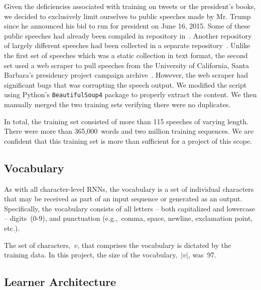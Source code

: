 \documentclass{article}
\begin{document}
Given the deficiencies associated with training on tweets or the president's books, we decided to exclusively limit ourselves to public speeches made by Mr. Trump since he announced his bid to run for president on June 16, 2015.  Some of these public speeches had already been compiled in repository in~\cite{ryanMcdermottTrumpSpeeches}.  Another repository of largely different speeches had been collected in a separate repository~\cite{pedramNavidTrumpSpeeches}.  Unlike the first set of speeches which was a static collection in text format, the second set used a web scraper to pull speeches from the University of California, Santa Barbara's presidency project campaign archive~\cite{americanPresidencyProject}.  However, the web scraper had significant bugs that was corrupting the speech output.  We modified the script using Python's \texttt{BeautifulSoup4} package to properly extract the content.  We then manually merged the two training sets verifying there were no duplicates.

In total, the training set consisted of more than 115 speeches of varying length.  There were more than 365,000~words and two million training sequences.  We are confident that this training set is more than sufficient for a project of this scope.

\subsection{Vocabulary}

As with all character-level RNNs, the vocabulary is a set of individual characters that may be received as part of an input sequence or generated as an output.  Specifically, the vocabulary consists of all letters -- both capitalized and lowercase -- digits~(0-9), and punctuation (e.g.,~comma, space, newline, exclamation point, etc.).

The set of characters,~$v$, that comprises the vocabulary is dictated by the training data.  In this project, the size of the vocabulary,~$|v|$, was~97.

\subsection{Learner Architecture}
\end{document}
